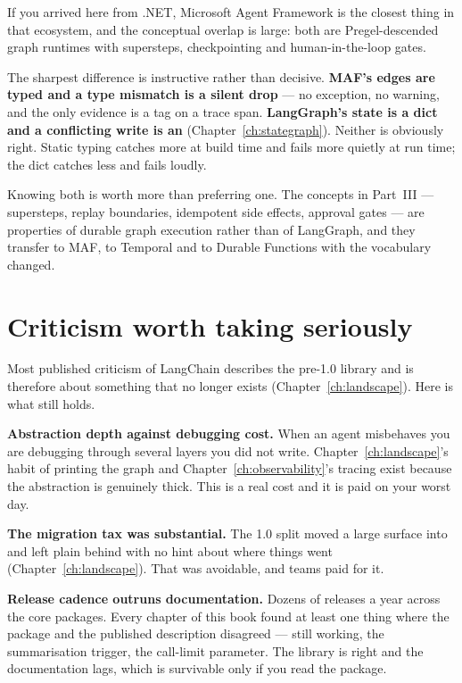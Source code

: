 If you arrived here from .NET, Microsoft Agent Framework is the closest thing in
that ecosystem, and the conceptual overlap is large: both are Pregel-descended
graph runtimes with supersteps, checkpointing and human-in-the-loop gates.

The sharpest difference is instructive rather than decisive. \textbf{MAF's edges
are typed and a type mismatch is a silent drop} --- no exception, no warning, and
the only evidence is a tag on a trace span. \textbf{LangGraph's state is a dict
and a conflicting write is an } (Chapter~\ref{ch:stategraph}).
Neither is obviously right. Static typing catches more at build time and fails
more quietly at run time; the dict catches less and fails loudly.

\begin{note}
Knowing both is worth more than preferring one. The concepts in Part~III ---
supersteps, replay boundaries, idempotent side effects, approval gates --- are
properties of durable graph execution rather than of LangGraph, and they transfer
to MAF, to Temporal and to Durable Functions with the vocabulary changed.
\end{note}

\section{Criticism worth taking seriously}
\label{sec:criticism}

Most published criticism of LangChain describes the pre-1.0 library and is
therefore about something that no longer exists
(Chapter~\ref{ch:landscape}). Here is what still holds.

\textbf{Abstraction depth against debugging cost.} When an agent misbehaves you
are debugging through several layers you did not write. Chapter~\ref{ch:landscape}'s
habit of printing the graph and Chapter~\ref{ch:observability}'s tracing exist
because the abstraction is genuinely thick. This is a real cost and it is paid on
your worst day.

\textbf{The migration tax was substantial.} The 1.0 split moved a large surface
into  and left plain  behind
with no hint about where things went (Chapter~\ref{ch:landscape}). That was
avoidable, and teams paid for it.

\textbf{Release cadence outruns documentation.} Dozens of releases a year across
the core packages. Every chapter of this book found at least one thing where the
package and the published description disagreed --- 
still working, the summarisation trigger, the call-limit parameter. The library
is right and the documentation lags, which is survivable only if you read the
package.

